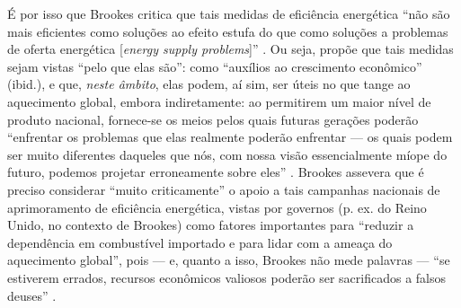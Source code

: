 É por isso que Brookes critica que tais medidas de eficiência energética ``não são mais eficientes como soluções ao efeito estufa do que como soluções a problemas de oferta energética [\textit{energy supply problems}]'' \parencite[p. 320]{Brookes1990}. Ou seja, propõe que tais medidas sejam vistas ``pelo que elas são'': como ``auxílios ao crescimento econômico'' (ibid.), e que, \textit{neste âmbito}, elas podem, aí sim, ser úteis no que tange ao aquecimento global, embora indiretamente: ao permitirem um maior nível de produto nacional, fornece-se os meios pelos quais futuras gerações poderão ``enfrentar os problemas que elas realmente poderão enfrentar --- os quais podem ser muito diferentes daqueles que nós, com nossa visão essencialmente míope do futuro, podemos projetar erroneamente sobre eles'' \parencite[p. 319]{Brookes1990}. Brookes assevera que é preciso considerar ``muito criticamente'' o apoio a tais campanhas nacionais de aprimoramento de eficiência energética, vistas por governos (p. ex. do Reino Unido, no contexto de Brookes) como fatores importantes para ``reduzir a dependência em combustível importado e para lidar com a ameaça do aquecimento global'', pois --- e, quanto a isso, Brookes não mede palavras --- ``se estiverem errados, recursos econômicos valiosos poderão ser sacrificados a falsos deuses'' \parencite[p. 321]{Brookes1990}. 




